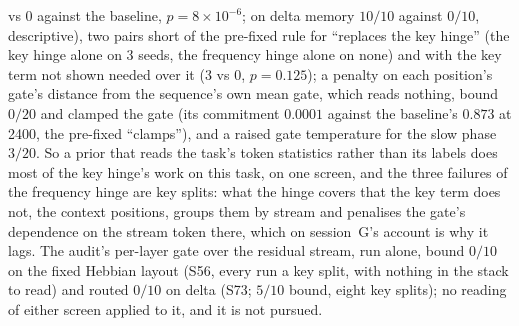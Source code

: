 \documentclass[11pt]{article}
\begin{document}
vs 0 against the baseline, $p = 8\times10^{-6}$; on delta memory $10/10$ against $0/10$, descriptive), two pairs short of the pre-fixed rule for ``replaces the key hinge'' (the key hinge alone on 3 seeds, the frequency hinge alone on none) and with the key term not shown needed over it (3 vs 0, $p = 0.125$); a penalty on each position's gate's distance from the sequence's own mean gate, which reads nothing, bound $0/20$ and clamped the gate (its commitment $0.0001$ against the baseline's $0.873$ at 2400, the pre-fixed ``clamps''), and a raised gate temperature for the slow phase $3/20$. So a prior that reads the task's token statistics rather than its labels does most of the key hinge's work on this task, on one screen, and the three failures of the frequency hinge are key splits: what the hinge covers that the key term does not, the context positions, groups them by stream and penalises the gate's dependence on the stream token there, which on session~G's account is why it lags. The audit's per-layer gate over the residual stream, run alone, bound $0/10$ on the fixed Hebbian layout (S56, every run a key split, with nothing in the stack to read) and routed $0/10$ on delta (S73; $5/10$ bound, eight key splits); no reading of either screen applied to it, and it is not pursued.
\end{document}
